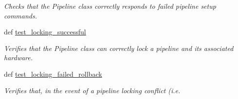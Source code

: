 \begin{DoxyCompactItemize}
\begin{DoxyCompactList}\small\item\em Checks that the Pipeline class correctly responds to failed pipeline setup commands. \end{DoxyCompactList}\item 
def \hyperlink{classhwm_1_1hardware_1_1pipelines_1_1tests_1_1test__pipeline_1_1_test_pipeline_acbbafe1bf23e6473b1a98eec98f6eeaa}{test\-\_\-locking\-\_\-successful}
\begin{DoxyCompactList}\small\item\em Verifies that the Pipeline class can correctly lock a pipeline and its associated hardware. \end{DoxyCompactList}\item 
def \hyperlink{classhwm_1_1hardware_1_1pipelines_1_1tests_1_1test__pipeline_1_1_test_pipeline_a6c908ebf291f5f28609ff03685735b43}{test\-\_\-locking\-\_\-failed\-\_\-rollback}
\begin{DoxyCompactList}\small\item\em Verifies that, in the event of a pipeline locking conflict (i.\-e. \end{DoxyCompactList}\end{DoxyCompactItemize}
